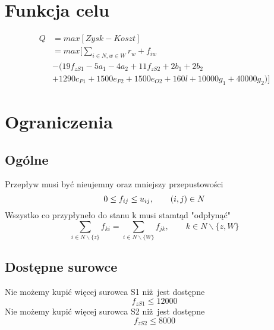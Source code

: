 \documentclass[12pt]{article}
\begin{document}
\section{Funkcja celu}
\begin{align*}
Q &= max[Zysk - Koszt] \\
&= max[\sum_{i \in N, w \in W} r_w + f_{iw} \\
&- (19f_{zS1} - 5a_1 - 4a_2 + 11f_{zS2} + 2b_1 + 2b_2 \\
&+ 1290c_{P1} + 1500e_{P2} +1500e_{O2} + 160l + 10000g_1 + 40000g_2)] 
\end{align*}

\section{Ograniczenia}
\subsection{Ogólne}
Przepływ musi być nieujemny oraz mniejszy przepustowości
\begin{equation}
0 \leq f_{ij} \leq u_{ij}, \qquad (i,j) \in N \\
\end{equation}
Wszystko co przypłyneło do stanu k musi stamtąd "odpłynąć"
\begin{equation}
\sum_{i \in N \backslash \{z\}} f_{ki} = \sum_{i \in N \backslash \{W\}} f_{jk}, \qquad k \in N \backslash \{z, W\}
\end{equation}

\subsection{Dostępne surowce}
Nie możemy kupić więcej surowca S1 niż jest dostępne
\begin{equation}
f_{zS1} \leq 12000
\end{equation}
Nie możemy kupić więcej surowca S2 niż jest dostępne
\begin{equation}
f_{zS2} \leq 8000
\end{equation}
\end{document}
